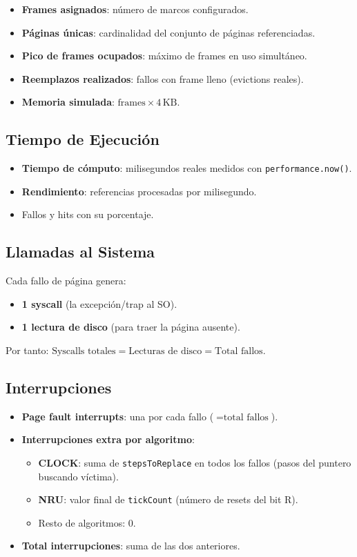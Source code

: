 \documentclass[12pt, a4paper]{article}
\begin{document}
\begin{itemize}
  \item \textbf{Frames asignados}: número de marcos configurados.
  \item \textbf{Páginas únicas}: cardinalidad del conjunto de páginas referenciadas.
  \item \textbf{Pico de frames ocupados}: máximo de frames en uso simultáneo.
  \item \textbf{Reemplazos realizados}: fallos con frame lleno (evictions reales).
  \item \textbf{Memoria simulada}: \(\text{frames} \times 4\,\text{KB}\).
\end{itemize}

\subsection{Tiempo de Ejecución}

\begin{itemize}
  \item \textbf{Tiempo de cómputo}: milisegundos reales medidos con \texttt{performance.now()}.
  \item \textbf{Rendimiento}: referencias procesadas por milisegundo.
  \item Fallos y hits con su porcentaje.
\end{itemize}

\subsection{Llamadas al Sistema}

Cada fallo de página genera:
\begin{itemize}
  \item \textbf{1 syscall} (la excepción/trap al SO).
  \item \textbf{1 lectura de disco} (para traer la página ausente).
\end{itemize}

Por tanto: \(\text{Syscalls totales} = \text{Lecturas de disco} = \text{Total fallos}\).

\subsection{Interrupciones}

\begin{itemize}
  \item \textbf{Page fault interrupts}: una por cada fallo (\(= \text{total fallos}\)).
  \item \textbf{Interrupciones extra por algoritmo}:
    \begin{itemize}
      \item \textbf{CLOCK}: suma de \texttt{stepsToReplace} en todos los fallos (pasos del puntero buscando víctima).
      \item \textbf{NRU}: valor final de \texttt{tickCount} (número de resets del bit R).
      \item Resto de algoritmos: 0.
    \end{itemize}
  \item \textbf{Total interrupciones}: suma de las dos anteriores.
\end{itemize}
\end{document}
